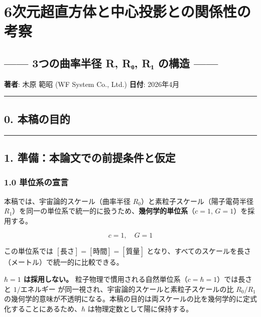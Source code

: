 \documentclass[
  a4paper,11pt]{ltjsarticle}
\theoremstyle{definition}
\theoremstyle{remark}
\begin{document}
\section{6次元超直方体と中心投影との関係性の考察}\label{ux6b21ux5143ux8d85ux76f4ux65b9ux4f53ux3068ux4e2dux5fc3ux6295ux5f71ux3068ux306eux95a2ux4fc2ux6027ux306eux8003ux5bdf}

\subsection{------ 3つの曲率半径 R, R₀, R₁ の構造
------}\label{ux3064ux306eux66f2ux7387ux534aux5f84-r-rux2080-rux2081-ux306eux69cbux9020}

\textbf{著者}: 木原 範昭 (WF System Co., Ltd.) \textbf{日付}: 2026年4月

\begin{center}\rule{0.5\linewidth}{0.5pt}\end{center}

\subsection{0. 本稿の目的}\label{ux672cux7a3fux306eux76eeux7684}

\begin{center}\rule{0.5\linewidth}{0.5pt}\end{center}

\subsection{1.
準備：本論文での前提条件と仮定}\label{ux6e96ux5099ux672cux8ad6ux6587ux3067ux306eux524dux63d0ux6761ux4ef6ux3068ux4eeeux5b9a}

\subsubsection{1.0
単位系の宣言}\label{ux5358ux4f4dux7cfbux306eux5ba3ux8a00}

本稿では、宇宙論的スケール（曲率半径
\(R_0\)）と素粒子スケール（陽子電荷半径
\(R_1\)）を同一の単位系で統一的に扱うため、\textbf{幾何学的単位系}（\(c = 1\),
\(G = 1\)）を採用する。

\[c = 1, \quad G = 1\]

この単位系では \([\text{長さ}] = [\text{時間}] = [\text{質量}]\)
となり、すべてのスケールを長さ（メートル）で統一的に比較できる。

\textbf{\(\hbar = 1\) は採用しない。}
粒子物理で慣用される自然単位系（\(c = \hbar = 1\)）では長さと
\(1/\text{エネルギー}\)
が同一視され、宇宙論的スケールと素粒子スケールの比 \(R_0 / R_1\)
の幾何学的意味が不透明になる。本稿の目的は両スケールの比を幾何学的に定式化することにあるため、\(\hbar\)
は物理定数として陽に保持する。
\end{document}
